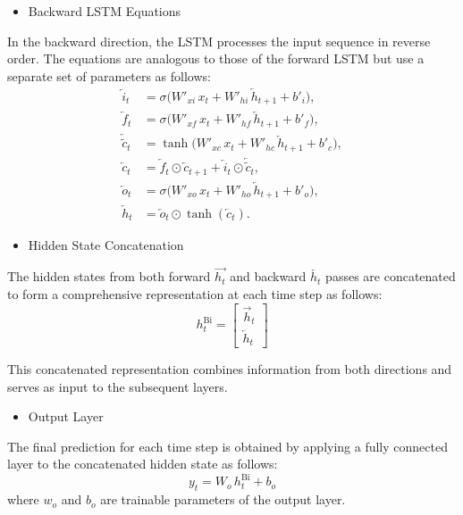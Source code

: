 \begin{itemize}
  \item Backward LSTM Equations
\end{itemize}
In the backward direction, the LSTM processes the input sequence in reverse order. The equations are analogous to those of the forward LSTM but use a separate set of parameters as follows:
\begin{equation}
\begin{aligned}
\overleftarrow{i}_t &= \sigma \big(W'_{xi}\, x_t + W'_{hi}\, \overleftarrow{h}_{t+1} + b'_i\big), \\
\overleftarrow{f}_t &= \sigma \big(W'_{xf}\, x_t + W'_{hf}\, \overleftarrow{h}_{t+1} + b'_f\big), \\
\overleftarrow{\tilde{c}}_t &= \tanh\big(W'_{xc}\, x_t + W'_{hc}\, \overleftarrow{h}_{t+1} + b'_c\big), \\
\overleftarrow{c}_t &= \overleftarrow{f}_t \odot \overleftarrow{c}_{t+1} + \overleftarrow{i}_t \odot \overleftarrow{\tilde{c}}_t, \\
\overleftarrow{o}_t &= \sigma \big(W'_{xo}\, x_t + W'_{ho}\, \overleftarrow{h}_{t+1} + b'_o\big), \\
\overleftarrow{h}_t &= \overleftarrow{o}_t \odot \tanh(\overleftarrow{c}_t).
\end{aligned}
\label{dfg-11058f3d808a}
\end{equation}

\begin{itemize}
  \item Hidden State Concatenation
\end{itemize}
The hidden states from both forward \( \overrightarrow{h_t} \) and backward \( \overleftarrow{h_t} \) passes are concatenated to form a comprehensive representation at each time step as follows:
\begin{equation}
h^{\text{Bi}}_t = \begin{bmatrix} \overrightarrow{h}_t \\ \overleftarrow{h}_t \end{bmatrix}
\label{dfg-9414f879b911}
\end{equation}

This concatenated representation combines information from both directions and serves as input to the subsequent layers.

\begin{itemize}
  \item Output Layer
\end{itemize}
The final prediction for each time step is obtained by applying a fully connected layer to the concatenated hidden state as follows:
\begin{equation}
y_t = W_o \, h^{\text{Bi}}_t + b_o
\label{dfg-2db508ca4efe}
\end{equation}
where \( w_o \) and \( b_o \) are trainable parameters of the output layer.


